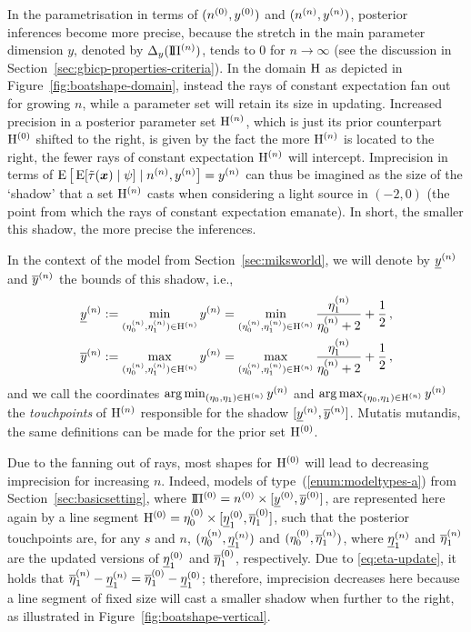 In the parametrisation in terms of $(n^{(0)},y^{(0)})$ and $(n^{(n)}, y^{(n)})$,
posterior inferences become more precise,
because the stretch in the main parameter dimension $y$, denoted by $\Delta_y(\text{I}\!\Pi^{(n)})$,
tends to $0$ for $n \to \infty$ (see the discussion in Section~\ref{sec:gbicp-properties-criteria}).
In the domain $\mathrm{H}$ as depicted in Figure~\ref{fig:boatshape-domain},
instead the rays of constant expectation fan out for growing $n$, %
while a parameter set will retain its size in updating.
Increased precision in a posterior parameter set $\mathrm{H}^{(n)}$, which is just
its prior counterpart $\mathrm{H}^{(0)}$ shifted to the right,
is given by the fact the more $\mathrm{H}^{(n)}$ is located to the right,
the fewer rays of constant expectation $\mathrm{H}^{(n)}$ will intercept.
Imprecision in terms of $\operatorname{E}\big[\operatorname{E}[\tilde{\tau}({\bm x}) \mid \psi] \mid n^{(n)}, y^{(n)}\big] = y^{(n)}$
can thus be imagined as the size of the `shadow' that a set $\mathrm{H}^{(n)}$ casts
when considering a light source in $(-2,0)$ (the point from which the rays of constant expectation emanate).
In short, the smaller this shadow, the more precise the inferences.

In the context of the model from Section~\ref{sec:miksworld},
we will denote by $\underline{y}^{(n)}$ and $\overline{y}^{(n)}$ the bounds of this shadow,
i.e.,
\begin{align*}
\underline{y}^{(n)} &:= \min_{(\eta_0^{(n)},\eta_1^{(n)}) \in \mathrm{H}^{(n)}} y^{(n)} = \min_{(\eta_0^{(n)},\eta_1^{(n)}) \in \mathrm{H}^{(n)}} \frac{\eta_1^{(n)}}{\eta_0^{(n)}+2} + \frac{1}{2}\,, \\
\overline{y}^{(n)} &:= \max_{(\eta_0^{(n)},\eta_1^{(n)}) \in \mathrm{H}^{(n)}} y^{(n)} = \max_{(\eta_0^{(n)},\eta_1^{(n)}) \in \mathrm{H}^{(n)}} \frac{\eta_1^{(n)}}{\eta_0^{(n)}+2} + \frac{1}{2}\,,
\end{align*}
and we call the coordinates $\operatorname*{arg\,min}_{(\eta_0,\eta_1) \in \mathrm{H}^{(n)}} y^{(n)}$ and $\operatorname*{arg\,max}_{(\eta_0,\eta_1) \in \mathrm{H}^{(n)}} y^{(n)}$
the \emph{touchpoints} of $\mathrm{H}^{(n)}$ responsible for the shadow $[\underline{y}^{(n)}, \overline{y}^{(n)}]$.
Mutatis mutandis, the same definitions can be made for the prior set $\mathrm{H}^{(0)}$.

Due to the fanning out of rays, most shapes for $\mathrm{H}^{(0)}$ will lead to decreasing imprecision for increasing $n$.
Indeed, models of type~(\ref{enum:modeltypes-a}) from Section~\ref{sec:basicsetting},
where $\text{I}\!\Pi^{(0)} = n^{(0)} \times [\underline{y}^{(0)}, \overline{y}^{(0)}]$,
are represented here again by a line segment $\mathrm{H}^{(0)} = \eta_0^{(0)} \times [\underline{\eta}_1^{(0)},\overline{\eta}_1^{(0)}]$,
such that the posterior touchpoints are, for any $s$ and $n$, $(\eta_0^{(n)},\underline{\eta}_1^{(n)})$ and $(\eta_0^{(0)},\overline{\eta}_1^{(n)})$,
where $\underline{\eta}_1^{(n)}$ and $\overline{\eta}_1^{(n)}$ are the updated versions of $\underline{\eta}_1^{(0)}$ and $\overline{\eta}_1^{(0)}$, respectively.
Due to \eqref{eq:eta-update}, it holds that $\overline{\eta}_1^{(n)}-\underline{\eta}_1^{(n)} = \overline{\eta}_1^{(0)}-\underline{\eta}_1^{(0)}$;
therefore, imprecision decreases here because a line segment of fixed size
will cast a smaller shadow when further to the right,
as illustrated in Figure~\ref{fig:boatshape-vertical}.

